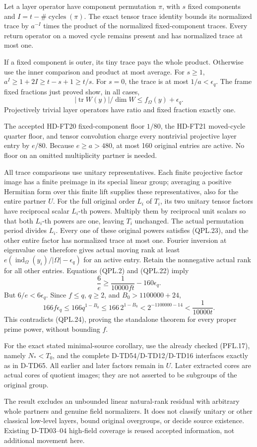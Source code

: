 Let a layer operator have component permutation \(\pi\),
with \(s\) fixed components and \(I=t-\#\operatorname{cycles}(\pi)\).
The exact tensor trace identity bounds its normalized trace
by \(a^{-I}\) times the product of the normalized fixed-component
traces. Every return operator on a moved cycle remains present
and has normalized trace at most one.

If a fixed component is outer, its tiny trace pays the whole
product. Otherwise use the inner comparison and product
at most average. For \(s\ge1\),
\(a^I\ge1+2I\ge t-s+1\ge t/s\).
For \(s=0\), the trace is at most \(1/a<\epsilon_q\).
The frame fixed fractions just proved show, in all cases,
\[
             |\operatorname{tr}W(y)|/\dim W
                         \le f_\Omega(y)+\epsilon_q.
 \tag{QPL.23}
\]
Projectively trivial layer operators have ratio and fixed
fraction exactly one.

The accepted HD-FT20 fixed-component floor \(1/80\), the
HD-FT21 moved-cycle quarter floor, and tensor convolution
charge every nontrivial projective layer entry by \(e/80\).
Because \(e\ge a>480\), at most 160 original entries are active.
No floor on an omitted multiplicity partner is needed.

All trace comparisons use unitary representatives. Each finite
projective factor image has a finite preimage in its special
linear group; averaging a positive Hermitian form over this
finite lift supplies these representatives, also for the entire
partner \(U\). For the full original order \(L_i\) of \(T_i\),
its two unitary tensor factors have reciprocal scalar
\(L_i\)-th powers. Multiply them by reciprocal unit scalars
so that both \(L_i\)-th powers are one, leaving \(T_i\) unchanged.
The actual permutation period divides
\(L_i\). Every one of these original powers satisfies
(QPL.23), and the other entire factor has normalized trace
at most one. Fourier inversion at eigenvalue one therefore
gives actual moving rank at least
\(e(\operatorname{ind}_\Omega(y_i)/|\Omega|-\epsilon_q)\)
for an active entry. Retain the nonnegative actual rank for
all other entries. Equations (QPL.2) and (QPL.22) imply
\[
                \frac6e\ge\frac1{10000ft}-160\epsilon_q.
 \tag{QPL.24}
\]
But \(6/e<6\epsilon_q\).
Since \(f\le q\), \(q\ge2\), and \(B_0>1100000+24\),
\[
 166f\epsilon_q\le166q^{1-B_0}
       \le166\,2^{1-B_0}<2^{-1100000-14}
                         <\frac1{10000t}.
 \tag{QPL.25}
\]
This contradicts (QPL.24), proving the standalone theorem
for every proper prime power, without bounding \(f\).

For the exact stated minimal-source corollary, use the
already checked (PFL.17), namely \(N_*<T_0\), and the complete
D-TD54/D-TD12/D-TD16 interfaces exactly as in D-TD65.
All earlier and later factors remain in \(U\).
Later extracted cores are actual cores of quotient images;
they are not asserted to be subgroups of the original group.

The result excludes an unbounded linear natural-rank
residual with arbitrary whole partners and genuine field
normalizers. It does not classify unitary or other classical
low-level layers, bound original overgroups, or decide
source existence. Existing D-TD03--04 high-field coverage is
reused accepted information, not additional movement here.

